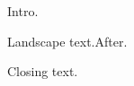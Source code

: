 \documentclass{article}\usepackage{setspace,lscape,multicol}
\begin{document}
Intro.

\begingroup\landscape Landscape text.\endgroup\endgroup After.

Closing text.
\end{document}
